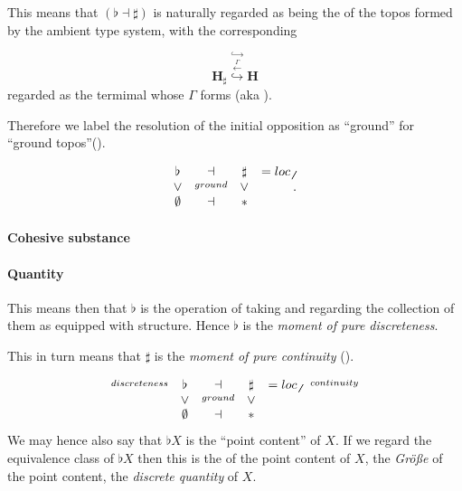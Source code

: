 \documentclass[12pt,titlepage]{article}
\newcommand{\itexarray}[1]{\begin{matrix}#1\end{matrix}}
\theoremstyle{plain}
\theoremstyle{definition}
\theoremstyle{remark}
\begin{document}
This means that $(\flat \dashv \sharp)$ is naturally regarded as being the \emph{} of the topos formed by the ambient type system, with the corresponding 

\begin{displaymath}
\mathbf{H}_{\sharp}
  \stackrel{\hookrightarrow}{\stackrel{\stackrel{\Gamma}{\longleftarrow}}{\hookrightarrow}}
  \mathbf{H}
\end{displaymath}
regarded as the termimal  whose  $\Gamma$ forms  (aka ).

Therefore we label the resolution of the initial opposition as ``ground'' for ``ground topos''().

\begin{displaymath}
\itexarray{
     \flat &\dashv& \sharp & = loc_{\not\not}
     \\
     \vee &\stackrel{ground}{}& \vee
     \\
     \emptyset &\dashv& \ast
  }
  \,.
\end{displaymath}
\hypertarget{cohesive_substance}{}\paragraph*{{Cohesive substance}}\label{cohesive_substance}

\hypertarget{IntensiveExtensive}{}\paragraph*{{Quantity}}\label{IntensiveExtensive}

This means then that $\flat$ is the operation of taking  and regarding the collection of them as equipped with  structure. Hence $\flat$ is the \emph{moment of pure discreteness}.

This in turn means that $\sharp$ is the \emph{moment of pure continuity} ().

\begin{displaymath}
\itexarray{
     \stackrel{discreteness}{} & \flat &\dashv& \sharp &= loc_{\not\not}& \stackrel{continuity}{}
     \\
     & \vee &\stackrel{ground}{}& \vee
     \\
     & \emptyset &\dashv& \ast &
  }
\end{displaymath}
We may hence also say that $\flat X$ is the ``point content'' of $X$. If we regard the equivalence class of $\flat X$ then this is the  of the point content of $X$, the \emph{Größe} of the point content, the \emph{discrete quantity} of $X$.
\end{document}
